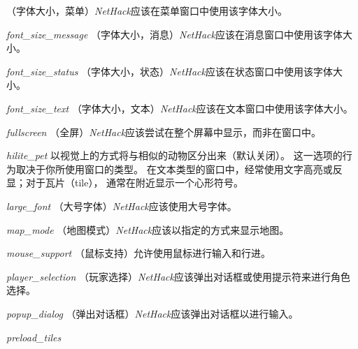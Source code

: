 \documentclass[a4paper, 10pt]{article}
\newcommand{\ib}[1]{\it #1 \hfill}
\begin{document}
（字体大小，菜单）{\it NetHack}应该在菜单窗口中使用该字体大小。
\item[\ib{font\_size\_message}]
（字体大小，消息）{\it NetHack}应该在消息窗口中使用该字体大小。
\item[\ib{font\_size\_status}]
（字体大小，状态）{\it NetHack}应该在状态窗口中使用该字体大小。
\item[\ib{font\_size\_text}]
（字体大小，文本）{\it NetHack}应该在文本窗口中使用该字体大小。
\item[\ib{fullscreen}]
（全屏）{\it NetHack}应该尝试在整个屏幕中显示，而非在窗口中。
\item[\ib{hilite\_pet}]
以视觉上的方式将\zhTransPets{}与相似的动物区分出来（默认关闭）。
这一选项的行为取决于你所使用窗口的类型。
在文本类型的窗口中，经常使用文字高亮或反显；对于瓦片（tile），
通常在\zhTransPets{}附近显示一个心形符号。
\item[\ib{large\_font}]
（大号字体）{\it NetHack}应该使用大号字体。
\item[\ib{map\_mode}]
（地图模式）{\it NetHack}应该以指定的方式来显示地图。
\item[\ib{mouse\_support}]
（鼠标支持）允许使用鼠标进行输入和行进。
\item[\ib{player\_selection}]
（玩家选择）{\it NetHack}应该弹出对话框或使用提示符来进行角色选择。
\item[\ib{popup\_dialog}]
（弹出对话框）{\it NetHack}应该弹出对话框以进行输入。
\item[\ib{preload\_tiles}]
\end{document}

